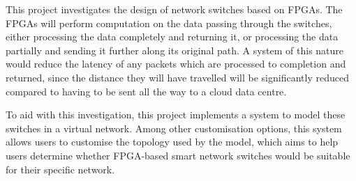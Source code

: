 This project investigates the design of network switches based on FPGAs.
The FPGAs will perform computation on the data passing through the switches, either processing the data completely and returning it, or processing the data partially and sending it further along its original path.
A system of this nature would reduce the latency of any packets which are processed to completion and returned, since the distance they will have travelled will be significantly reduced compared to having to be sent all the way to a cloud data centre.

To aid with this investigation, this project implements a system to model these switches in a virtual network.
Among other customisation options, this system allows users to customise the topology used by the model, which aims to help users determine whether FPGA-based smart network switches would be suitable for their specific network.
